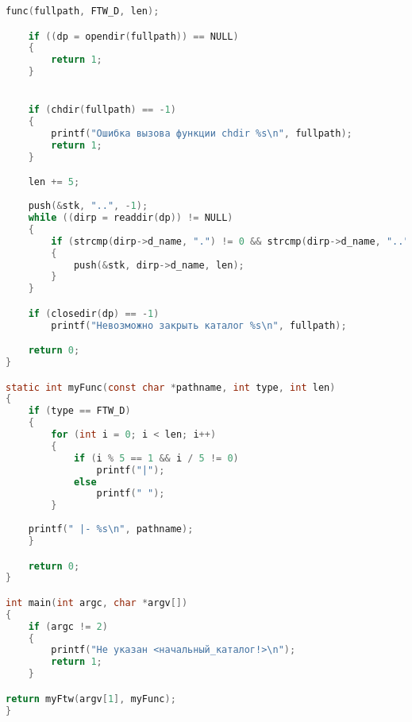 \begin{lstlisting}[language=c,caption=Листинг кода программы]
	func(fullpath, FTW_D, len);

	if ((dp = opendir(fullpath)) == NULL)
	{
		return 1;
	}


	if (chdir(fullpath) == -1)
	{
		printf("Ошибка вызова функции chdir %s\n", fullpath);
		return 1;
	}

	len += 5;
	
	push(&stk, "..", -1);
	while ((dirp = readdir(dp)) != NULL)
	{
		if (strcmp(dirp->d_name, ".") != 0 && strcmp(dirp->d_name, "..") != 0 && strcmp(dirp->d_name, ".git") != 0)
		{
			push(&stk, dirp->d_name, len);
		}
	}

	if (closedir(dp) == -1)
		printf("Невозможно закрыть каталог %s\n", fullpath);

	return 0;
}

static int myFunc(const char *pathname, int type, int len)
{
	if (type == FTW_D)
	{
		for (int i = 0; i < len; i++)
		{
			if (i % 5 == 1 && i / 5 != 0)
				printf("|");
			else
				printf(" ");
		}
		
	printf(" |- %s\n", pathname);
	}

	return 0;
}

int main(int argc, char *argv[])
{
	if (argc != 2)
	{
		printf("Не указан <начальный_каталог!>\n");
		return 1;
	}

return myFtw(argv[1], myFunc); 
}
\end{lstlisting}
